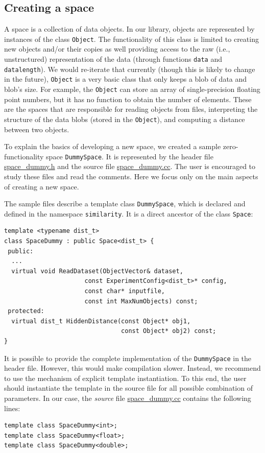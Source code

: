 \documentclass[runningheads,a4paper]{llncs}
\newcommand{\ttt}[1]{\texttt{#1}}
\begin{document}
{\subsection{Creating a space}\label{SectionCreateSpace}
A space is a collection of data objects.
In our library, objects are represented by instances
of the class \ttt{Object}.
The functionality of this class is limited to
creating new objects and/or their copies as well providing
access to the raw (i.e., unstructured) representation of the data
(through functions \ttt{data} and \ttt{datalength}).
We would re-iterate that currently (though this is likely to change in the future),
\ttt{Object} is a very basic class that only keeps a blob of data and blob's size.
For example, the \ttt{Object} can store an array of single-precision floating point
numbers, but it has no function to obtain the number of elements.
These are the spaces that are responsible for reading objects from files,
interpreting the structure of the data blobs (stored in the \ttt{Object}), 
and computing a distance between two objects.


To explain the basics of developing a new space,
we created a sample zero-functionality space \texttt{DummySpace}.
It is represented by 
the header file 
\href{https://github.com/searchivarius/NonMetricSpaceLib/blob/master/similarity_search/include/space/space_dummy.h}{space\_dummy.h}
and the source file
\href{https://github.com/searchivarius/NonMetricSpaceLib/blob/master/similarity_search/src/space/space_dummy.cc}{space\_dummy.cc}.
The user is encouraged to study these files and read the comments.
Here we focus only on the main aspects of creating a new space.

The sample files describe a template class \ttt{DummySpace}, 
which is declared and defined in the namespace \ttt{similarity}.
It is a direct ancestor of the class \ttt{Space}:

\begin{verbatim}
template <typename dist_t>
class SpaceDummy : public Space<dist_t> {
 public:
  ...
  virtual void ReadDataset(ObjectVector& dataset,
                      const ExperimentConfig<dist_t>* config,
                      const char* inputfile,
                      const int MaxNumObjects) const;
 protected:
  virtual dist_t HiddenDistance(const Object* obj1, 
                                const Object* obj2) const;
}
\end{verbatim}
It is possible to provide the complete implementation of the \ttt{DummySpace}
in the header file. However, this would make compilation slower.
Instead, we recommend to use the mechanism of explicit template instantiation.
To this end, the user should instantiate the template in the source file
for all possible combination of parameters.
In our case, the \emph{source} file 
\href{https://github.com/searchivarius/NonMetricSpaceLib/blob/master/similarity_search/src/space/space_dummy.cc}{space\_dummy.cc}
contains the following lines:
\begin{verbatim}
template class SpaceDummy<int>;
template class SpaceDummy<float>;
template class SpaceDummy<double>;
\end{verbatim}

}
\end{document}
